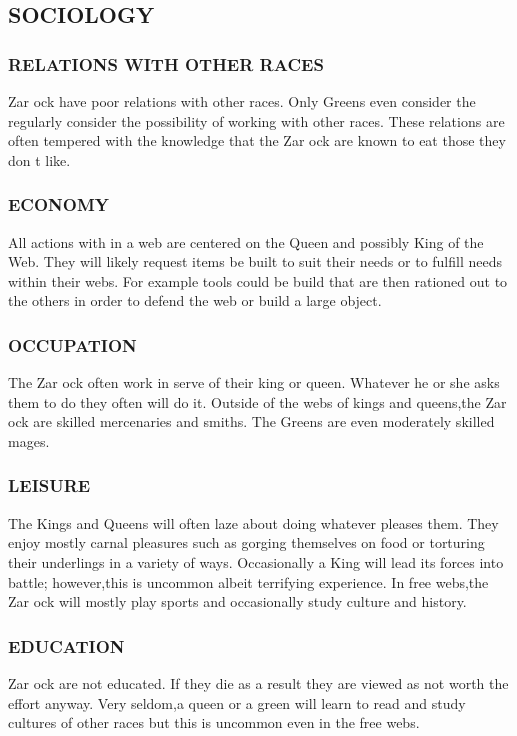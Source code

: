 \subsection{SOCIOLOGY}
\subsubsection{RELATIONS WITH OTHER RACES}
Zar ock have poor relations with other races.  Only Greens even consider the
regularly consider the possibility of working with other races.  These
relations are often tempered with the knowledge that the Zar ock are known to
eat those they don t like.
\subsubsection{ECONOMY}
All actions with in a web are centered on the Queen and possibly King of the
Web.  They will likely request items be built to suit their needs or to fulfill
needs within their webs.  For example tools could be build that are then
rationed out to the others in order to defend the web or build a large object.
\subsubsection{OCCUPATION}
The Zar ock often work in serve of their king or queen.  Whatever he or she
asks them to do they often will do it.  Outside of the webs of kings and
queens,the Zar ock are skilled mercenaries and smiths.  The Greens are even
moderately skilled mages.
\subsubsection{LEISURE}
The Kings and Queens will often laze about doing whatever pleases them.  They
enjoy mostly carnal pleasures such as gorging themselves on food or torturing
their underlings in a variety of ways.  Occasionally a King will lead its
forces into battle; however,this is uncommon albeit terrifying experience.  In
free webs,the Zar ock will mostly play sports and occasionally study culture
and history.
\subsubsection{EDUCATION}
Zar ock are not educated.  If they die as a result they are viewed as not worth
the effort anyway.  Very seldom,a queen or a green will learn to read and study
cultures of other races but this is uncommon even in the free webs.
